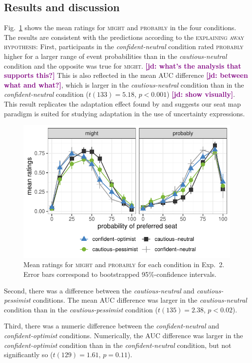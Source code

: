 \documentclass[man,floatsintext]{apa6}
\newcommand{\jd}[1]{\textcolor{Purple}{\bf [jd: #1]}}
\begin{document}
\subsection{Results and discussion}

Fig.~\ref{fig:results-exp2} shows the mean ratings for \textsc{might} and \textsc{probably} in the four conditions. The results are consistent with the predictions according to the \textsc{explaining away hypothesis}: First, participants in the \textit{confident-neutral} condition rated \textsc{probably} higher for a larger range of event probabilities than in the \textit{cautious-neutral} condition and the opposite was true for \textsc{might}. \jd{what's the analysis that supports this?} This is also reflected in the mean AUC difference \jd{between what and what?}, which is larger in the \textit{cautious-neutral} condition than in the \textit{confident-neutral} condition ($t(133)=5.18$, $p < 0.001$) \jd{show visually}. This result replicates the adaptation effect found by  and suggests our seat map paradigm is suited for studying adaptation in the use of uncertainty expressions.

\begin{figure}[t]
    \centering
    \includegraphics[width=.5\columnwidth]{explaining-away.pdf}
    \caption{Mean ratings for \textsc{might} and \textsc{probably} for each condition in Exp.~2. Error bars correspond to bootstrapped 95\%-confidence intervals.}
    \label{fig:results-exp2}
\end{figure}


Second, there was a difference between the \textit{cautious-neutral} and \textit{cautious-pessimist} conditions. The mean AUC difference was larger in the \textit{cautious-neutral} condition than in the \textit{cautious-pessimist} condition  ($t(135)=2.38$, $p < 0.02$).

Third, there was a numeric difference between the \textit{confident-neutral} and \textit{confident-optimist} conditions. Numerically, the AUC difference was larger in the \textit{confident-optimist} condition than in the \textit{confident-neutral} condition, but not significantly so ($t(129) =1.61$, $p = 0.11$).
\end{document}
